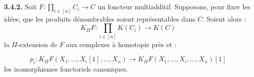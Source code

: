 \noindent\textbf{3.4.2.}\quad
{}
Soit
$F\colon\prod_{i\in[n]}C_i\longrightarrow C$ un foncteur multiadditif.
Supposons, pour fixer les idées, que les produits dénombrables soient
représentables dans $C$. Soient alors :
\[
  K_{\Pi}F\colon\prod_{i\in[n]}K(C_i)\longrightarrow K(C)
\]
la $\Pi$-extension de $F$ aux complexes à homotopie près et :

\[
  p_i\colon K_{\Pi}F(X_1,\ldots,X_i[1],\ldots,X_n)
  \longrightarrow K_{\Pi}F(X_1,\ldots,X_i,\ldots,X_n)[1]
\]
les isomorphismes fonctoriels canoniques.
\endgroup
